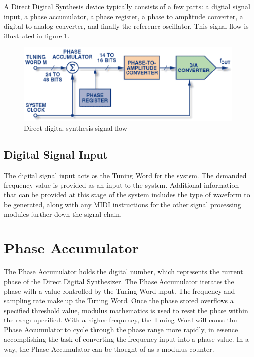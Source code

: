 \documentclass[a4paper,12pt]{report}
\begin{document}
A Direct Digital Synthesis device typically consists of a few parts: a digital signal input, a phase accumulator, a phase register, a phase to amplitude converter, a digital to analog converter, and finally the reference oscillator. This signal flow is illustrated in figure \ref{fig:dds}.

\begin{figure}
    \centering
    \includegraphics[width=36em]{DDS.png}
    \caption{Direct digital synthesis signal flow}
    \label{fig:dds}
\end{figure}

\subsection{Digital Signal Input}
\label{subsec:digitalsignalinput}
The digital signal input acts as the Tuning Word for the system. The demanded frequency value is provided as an input to the system. Additional information that can be provided at this stage of the system includes the type of waveform to be generated, along with any MIDI instructions for the other signal processing modules further down the signal chain.

\section{Phase Accumulator}
\label{sec:phaseaccu}
The Phase Accumulator holds the digital number, which represents the current phase of the Direct Digital Synthesizer. The Phase Accumulator iterates the phase with a value controlled by the Tuning Word input. The frequency and sampling rate make up the Tuning Word. Once the phase stored overflows a specified threshold value, modulus mathematics is used to reset the phase within the range specified. With a higher frequency, the Tuning Word will cause the Phase Accumulator to cycle through the phase range more rapidly, in essence accomplishing the task of converting the frequency input into a phase value. In a way, the Phase Accumulator can be thought of as a modulus counter.
\end{document}
